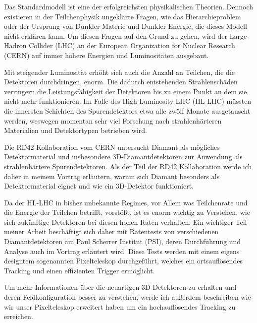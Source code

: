\documentclass{mlabstract}
\institute{Institut f\"ur Teilchen- und Astrophysik, Eidgen\"ossische Technische Hochschule Z\"urich}
\begin{document}
Das Standardmodell ist eine der erfolgreichsten physikalischen Theorien. Dennoch existieren in der Teilchenphysik ungekl\"arte Fragen, wie das Hierarchieproblem oder der Ursprung von Dunkler Materie und Dunkler Energie, die dieses Modell nicht erkl\"aren kann. Um diesen Fragen auf den Grund zu gehen, wird der Large Hadron Collider (LHC) an der European Organization for Nuclear Research (CERN) auf immer h\"ohere Energien und Luminosit\"aten ausgebaut.\par

Mit steigender Luminosit\"at erh\"oht sich auch die Anzahl an Teilchen, die die Detektoren durchdringen, enorm. Die dadurch entstehenden Strahlensch\"aden verringern die Leistungsf\"ahigkeit der Detektoren bis zu einem Punkt an dem sie nicht mehr funktionieren. Im Falle des High-Luminosity-LHC (HL-LHC) m\"ussten die innersten Schichten des Spurendetektors etwa alle zw\"olf Monate ausgetauscht werden, weswegen momentan sehr viel Forschung nach strahlenh\"arteren Materialien und Detektortypen betrieben wird.\par

Die RD42 Kollaboration vom CERN untersucht Diamant als m\"ogliches Detektormaterial und insbesondere 3D-Diamantdetektoren zur Anwendung als strahlenh\"artere Spurendetektoren. Als der Teil der RD42 Kollaboration werde ich daher in meinem Vortrag erl\"autern, warum sich Diamant besonders als Detektormaterial eignet und wie ein 3D-Detektor funktioniert.\par

Da der HL-LHC in bisher unbekannte Regimes, vor Allem was Teilchenrate und die Energie der Teilchen betrifft, vorst\"o{\ss}t, ist es enorm wichtig zu Verstehen, wie sich zuk\"unftige Detektoren bei diesen hohen Raten verhalten. Ein wichtiger Teil meiner Arbeit besch\"aftigt sich daher mit Ratentests von verschiedenen Diamantdetektoren am Paul Scherrer Institut (PSI), deren Durchf\"uhrung und Analyse auch im Vortrag erl\"autert wird. Diese Tests werden mit einem eigens designtem sogenannten Pixelteleskop durchgef\"uhrt, welches ein ortsaufl\"osendes Tracking und einen effizienten Trigger erm\"oglicht.\par

Um mehr Informationen \"uber die neuartigen 3D-Detektoren zu erhalten und deren Feldkonfiguration besser zu verstehen, werde ich au{\ss}erdem beschreiben wie wir unser Pixelteleskop erweitert haben um ein hochaufl\"osendes Tracking zu erreichen.
\end{document}
